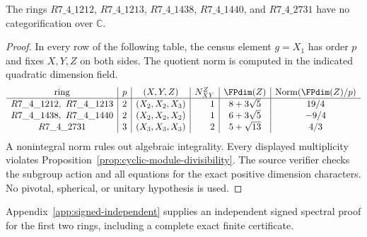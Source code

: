 \begin{proposition}\label{prop:cyclic-module-cases}
The rings $R7\_4\_1212$, $R7\_4\_1213$, $R7\_4\_1438$,
$R7\_4\_1440$, and $R7\_4\_2731$ have no categorification over
$\mathbb C$.
\end{proposition}
\begin{proof}
In every row of the following table, the census element $g=X_1$
has order $p$ and fixes $X,Y,Z$ on both sides. The quotient norm is
computed in the indicated quadratic dimension field.
\[
\begin{array}{c|r|c|r|c|c}
\text{ring}&p&(X,Y,Z)&N_{XY}^Z&\FPdim(Z)&
 \operatorname{Norm}(\FPdim(Z)/p)\\ \hline
R7\_4\_1212,\ R7\_4\_1213&2&(X_2,X_2,X_3)&1&8+3\sqrt5&19/4\\
R7\_4\_1438,\ R7\_4\_1440&2&(X_2,X_2,X_2)&1&6+3\sqrt5&-9/4\\
R7\_4\_2731&3&(X_3,X_3,X_3)&2&5+\sqrt{13}&4/3
\end{array}
\]
A nonintegral norm rules out algebraic integrality. Every displayed
multiplicity violates Proposition~\ref{prop:cyclic-module-divisibility}.
The source verifier checks the subgroup action and all equations for
the exact positive dimension characters. No pivotal, spherical, or
unitary hypothesis is used.
\end{proof}

Appendix~\ref{app:signed-independent} supplies an independent signed
spectral proof for the first two rings, including a complete exact
finite certificate.
